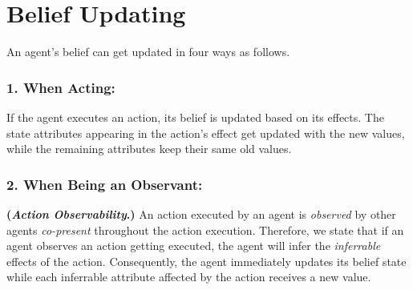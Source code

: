 \documentclass[letterpaper]{article} %
\begin{document}

\section{Belief Updating}
An agent's belief can get updated in four ways as follows. 

\subsubsection{1. When Acting:}
If the agent executes an action, its belief is updated based on its effects. The state attributes appearing in the action's effect get updated with the new values, while the remaining attributes keep their same old values.

\subsubsection{2. When Being an Observant:}
\hspace{-0.05in}
\textbf{(\textit{Action Observability}.)}
% 
An action executed by an agent is \textit{observed} by other agents \emph{co-present} throughout the action execution. Therefore, we state that if an agent observes an action getting executed, the agent will infer the \textit{inferrable} effects of the action.
Consequently, the agent immediately updates its belief state while each inferrable attribute affected by the action receives a new value.  
\end{document}
